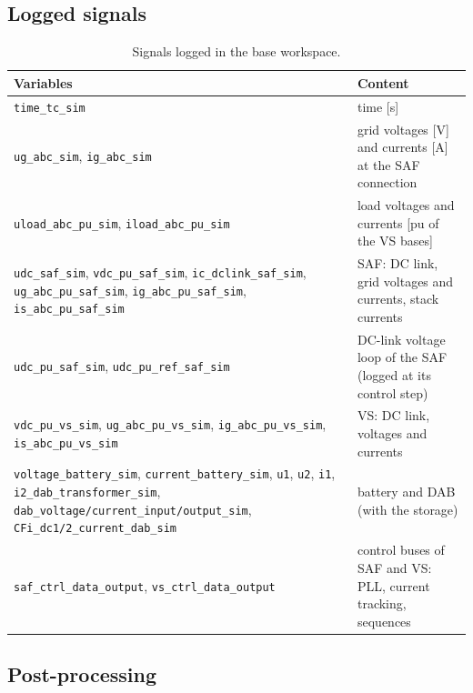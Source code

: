 \documentclass[11pt,a4paper]{scrartcl}
\newcommand{\code}[1]{\texttt{#1}}
\begin{document}
\begin{onehalfspace}
\subsection{Logged signals}

\begin{table}[H]
	\centering
	\captionsetup{width=0.9\textwidth, font=small}
	\caption{Signals logged in the base workspace.}
	\label{tab:signals}
	\footnotesize
	\begin{tabularx}{0.97\textwidth}{@{} >{\raggedright\arraybackslash}p{} X @{}}
		\toprule
		\textbf{Variables} & \textbf{Content} \\
		\midrule
		\code{time\_tc\_sim} & time [s] \\
		\code{ug\_abc\_sim}, \code{ig\_abc\_sim} & grid voltages [V] and currents [A] at the SAF connection \\
		\code{uload\_abc\_pu\_sim}, \code{iload\_abc\_pu\_sim} & load voltages and currents [pu of the VS bases] \\
		\code{udc\_saf\_sim}, \code{vdc\_pu\_saf\_sim}, \code{ic\_dclink\_saf\_sim}, \code{ug\_abc\_pu\_saf\_sim}, \code{ig\_abc\_pu\_saf\_sim}, \code{is\_abc\_pu\_saf\_sim} & SAF: DC link, grid voltages and currents, stack currents \\
		\code{udc\_pu\_saf\_sim}, \code{udc\_pu\_ref\_saf\_sim} & DC-link voltage loop of the SAF (logged at its control step) \\
		\code{vdc\_pu\_vs\_sim}, \code{ug\_abc\_pu\_vs\_sim}, \code{ig\_abc\_pu\_vs\_sim}, \code{is\_abc\_pu\_vs\_sim} & VS: DC link, voltages and currents \\
		\code{voltage\_battery\_sim}, \code{current\_battery\_sim}, \code{u1}, \code{u2}, \code{i1}, \code{i2\_dab\_transformer\_sim}, \code{dab\_voltage/current\_input/output\_sim}, \code{CFi\_dc1/2\_current\_dab\_sim} & battery and DAB (with the storage) \\
		\code{saf\_ctrl\_data\_output}, \code{vs\_ctrl\_data\_output} & control buses of SAF and VS: PLL, current tracking, sequences \\
		\bottomrule
	\end{tabularx}
\end{table}

\subsection{Post-processing}
\label{sec:post}


\end{onehalfspace}
\end{document}

